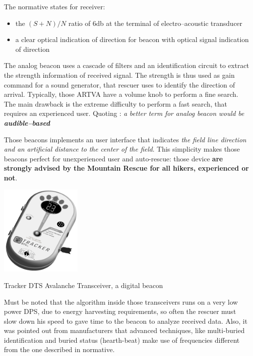 The normative states for receiver:
\begin{itemize}
	\item the $(S+N)/N$ ratio of \num{6}\si{\decibel} at the terminal of electro--acoustic transducer
	\item a clear optical indication of direction for beacon with optical signal indication of direction
\end{itemize}

The analog beacon uses a cascade of filters and an identification circuit to extract the strength information of received signal. The strength is thus used as gain command for a sound generator, that rescuer uses to identify the direction of arrival. Typically, those ARTVA have a volume knob to perform a fine search. The main drawback is the extreme difficulty to perform a fast search, that requires an experienced user. Quoting \citep{457andfuture}: \emph{a better term for analog beacon would be \textbf{audible--based}}

Those beacons implements an user interface that indicates \emph{the field line direction and an artificial distance to the center of the field}. This simplicity makes those beacons perfect for unexperienced user and auto-rescue: those device \textbf{are strongly advised by the Mountain Rescue for all hikers, experienced or not}.

\begin{marginfigure}
	\centering
	\includegraphics[width=4cm]{ch1/img/digital_baecon}
	\caption{Tracker DTS Avalanche Transceiver, a digital beacon}
\end{marginfigure}

Must be noted that the algorithm inside those transceivers runs on a very low power DPS, due to energy harvesting requirements, so often the rescuer must slow down his speed to gave time to the beacon to analyze received data. Also, it was pointed out from manufacturers that advanced techniques, like multi-buried identification and buried status (hearth-beat) make use of frequencies different from the one described in normative.

